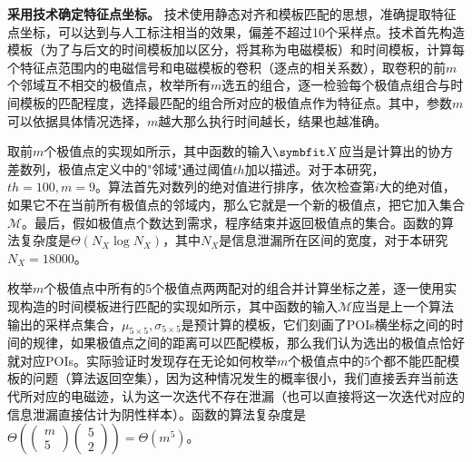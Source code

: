 {{	%
	
	\textbf{采用\yuchuli 技术确定特征点坐标。}
	\yuchuli 技术使用静态对齐和模板匹配的思想，准确提取特征点坐标，可以达到与人工标注相当的效果，偏差不超过10个采样点。\yuchuli 技术首先构造模板（为了与后文的时间模板加以区分，将其称为电磁模板）和时间模板，计算每个特征点范围内的电磁信号和电磁模板的卷积（逐点的相关系数），取卷积的前$m$个邻域互不相交的极值点，枚举所有$m$选五的组合，逐一检验每个极值点组合与时间模板的匹配程度，选择最匹配的组合所对应的极值点作为特征点。其中，参数$m$可以依据具体情况选择，$m$越大那么执行时间越长，结果也越准确。
	
	取前$m$个极值点的实现如所示，其中函数的输入$\Vector X$应当是计算出的协方差数列，极值点定义中的"邻域"通过阈值$th$加以描述。对于本研究，$th=100,m=9$。算法首先对数列的绝对值进行排序，依次检查第$i$大的绝对值，如果它不在当前所有极值点的邻域内，那么它就是一个新的极值点，把它加入集合$\mathcal M$。最后，假如极值点个数达到需求，程序结束并返回极值点的集合。函数的算法复杂度是$\Theta(N_X\log N_X)$，其中$N_X$是信息泄漏所在区间的宽度，对于本研究$N_X=18000$。
	
	枚举$m$个极值点中所有的5个极值点两两配对的组合并计算坐标之差，逐一使用实现构造的时间模板进行匹配的实现如所示，其中函数的输入$\mathcal M$应当是上一个算法输出的采样点集合，$\mu_{5\times5},\sigma_{5\times5}$是预计算的模板，它们刻画了POIs横坐标之间的时间的规律，如果极值点之间的距离可以匹配模板，那么我们认为选出的极值点恰好就对应POIs。实际验证时发现存在无论如何枚举$m$个极值点中的5个都不能匹配模板的问题（算法返回空集），因为这种情况发生的概率很小，我们直接丢弃当前迭代所对应的电磁迹，认为这一次迭代不存在泄漏（也可以直接将这一次迭代对应的信息泄漏直接估计为阴性样本）。函数的算法复杂度是$\Theta\left( \begin{pmatrix}m\\5\end{pmatrix}\begin{pmatrix}5\\2\end{pmatrix}\right) =\Theta(m^5)$。
	
}}
